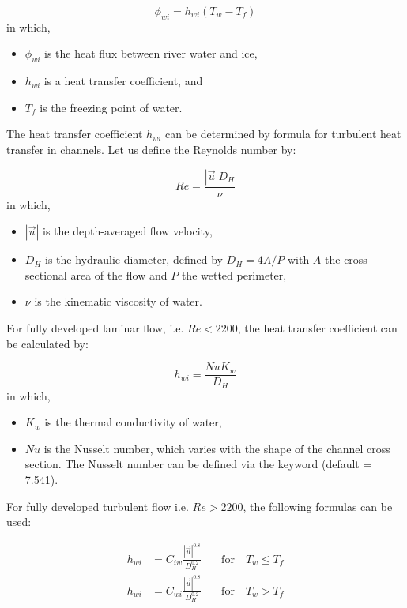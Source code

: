 \begin{equation} \label{eq:phiwi}
\phi_{wi} = h_{wi} ( T_w-T_f )
\end{equation}
in which,
\begin{itemize}
  \item $\phi_{wi}$ is the heat flux between river water and ice,
	\item $h_{wi}$ is a heat transfer coefficient, and
	\item $T_f$ is the freezing point of water.
\end{itemize}

The heat transfer coefficient $h_{wi}$ can be determined by formula for turbulent heat transfer in channels.
Let us define the Reynolds number by:

\begin{equation} \label{eq:re}
Re = \dfrac{|\vec{u}| D_H}{ \nu}
\end{equation}
in which,
\begin{itemize}
	\item $|\vec{u}|$ is the depth-averaged flow velocity,
	\item $D_H$ is the hydraulic diameter, defined by $D_H= 4A/P$ with $A$ the cross sectional area of the flow and $P$ the wetted perimeter,
	\item $\nu$ is the kinematic viscosity of water.
\end{itemize}

For fully developed laminar flow, i.e. $Re < 2200$,
the heat transfer coefficient can be calculated by:

\begin{equation} \label{eq:hwi}
h_{wi} = \frac{Nu K_w}{D_H}
\end{equation}
in which,
\begin{itemize}
	\item $K_w$ is the thermal conductivity of water,
	\item $Nu$ is the Nusselt number, which varies with the shape of the channel cross section. The Nusselt number can be defined via the keyword  (default = 7.541).
\end{itemize}

For fully developed turbulent flow i.e. $Re > 2200$, the following formulas can be used:

\begin{equation} \label{eq:hwi}
\begin{aligned}
h_{wi} &= C_{iw}\frac{|\vec{u}|^{0.8}}{D_H^{0.2}}\quad & \text{for} \quad T_w \leq T_f \\
h_{wi} &= C_{wi}\frac{|\vec{u}|^{0.8}}{D_H^{0.2}}\quad & \text{for} \quad T_w > T_f
\end{aligned}
\end{equation}

